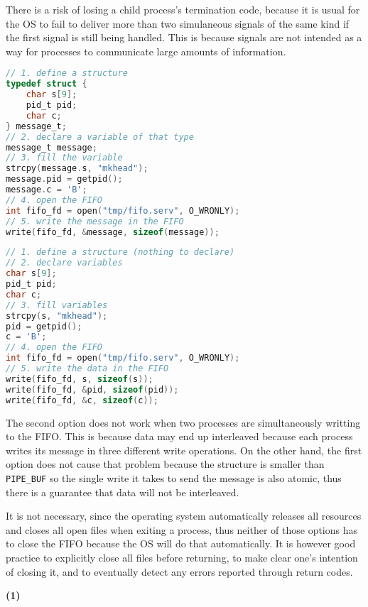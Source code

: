 \documentclass{sope}
\begin{document}
There is a risk of losing a child process's termination code, because it is usual for the OS to fail to deliver more than two simulaneous signals of the same kind if the first signal is still being handled. This is because signals are not intended as a way for processes to communicate large amounts of information.

\begin{lstlisting}[language=C]
// 1. define a structure
typedef struct {
    char s[9];
    pid_t pid;
    char c;
} message_t;
// 2. declare a variable of that type
message_t message;
// 3. fill the variable
strcpy(message.s, "mkhead");
message.pid = getpid();
message.c = 'B';
// 4. open the FIFO
int fifo_fd = open("tmp/fifo.serv", O_WRONLY);
// 5. write the message in the FIFO
write(fifo_fd, &message, sizeof(message));
\end{lstlisting}

\begin{lstlisting}[language=C]
// 1. define a structure (nothing to declare)
// 2. declare variables
char s[9];
pid_t pid;
char c;
// 3. fill variables
strcpy(s, "mkhead");
pid = getpid();
c = 'B';
// 4. open the FIFO
int fifo_fd = open("tmp/fifo.serv", O_WRONLY);
// 5. write the data in the FIFO
write(fifo_fd, s, sizeof(s));
write(fifo_fd, &pid, sizeof(pid));
write(fifo_fd, &c, sizeof(c));
\end{lstlisting}

The second option does not work when two processes are simultaneously writting to the FIFO. This is because data may end up interleaved because each process writes its message in three different write operations. On the other hand, the first option does not cause that problem because the structure is smaller than \texttt{PIPE\_BUF} so the single write it takes to send the message is also atomic, thus there is a guarantee that data will not be interleaved.

It is not necessary, since the operating system automatically releases all resources and closes all open files when exiting a process, thus neither of those options has to close the FIFO because the OS will do that automatically. It is however good practice to explicitly close all files before returning, to make clear one's intention of closing it, and to eventually detect any errors reported through return codes.

\textbf{(1)}
\end{document}
